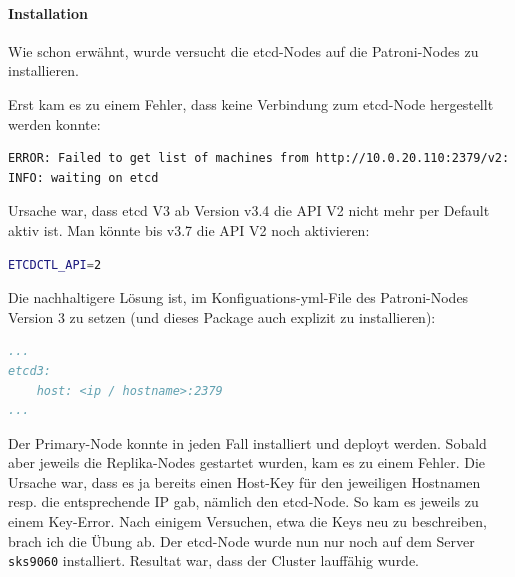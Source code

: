 \clearpage
\begin{flushleft}
    \paragraph{Installation}
    \label{par:patroni_installation}
    Wie schon erwähnt, wurde versucht die \gls{etcd}-Nodes auf die Patroni-Nodes zu installieren.
\end{flushleft}
\begin{flushleft}
    Erst kam es zu einem Fehler, dass keine Verbindung zum \gls{etcd}-Node hergestellt werden konnte:
\lstset{style=gra_codestyle}
\begin{lstlisting}[language=bash, caption=Patroni - etcd API V2 Error,captionpos=b,label={lst:patroni_etcd_api_v2_error},breaklines=true]
ERROR: Failed to get list of machines from http://10.0.20.110:2379/v2: EtcdException('Bad response : 404 page not found\n')
INFO: waiting on etcd
\end{lstlisting}
    Ursache war, dass \gls{etcd} V3 ab Version v3.4 die API V2 nicht mehr per Default aktiv ist.
    Man könnte bis v3.7 die API V2 noch aktivieren:
\lstset{style=gra_codestyle}
\begin{lstlisting}[language=bash, caption=Patroni - etcd API V2 Enable,captionpos=b,label={lst:patroni_etcd_api_v2_enable},breaklines=true]
ETCDCTL_API=2
\end{lstlisting}
    Die nachhaltigere Lösung ist, im Konfiguations-yml-File des Patroni-Nodes Version 3 zu setzen (und dieses Package auch explizit zu installieren):
\lstset{style=gra_codestyle}
\begin{lstlisting}[language=yaml, caption=Patroni - etcd3 Flag,captionpos=b,label={lst:patroni_etcd3_flag},breaklines=true]
...
etcd3:
    host: <ip / hostname>:2379
...
\end{lstlisting}
\end{flushleft}
\begin{flushleft}
    Der Primary-Node konnte in jeden Fall installiert und deployt werden.
    Sobald aber jeweils die Replika-Nodes gestartet wurden, kam es zu einem Fehler.
    Die Ursache war, dass es ja bereits einen Host-Key für den jeweiligen Hostnamen resp.
    die entsprechende IP gab, nämlich den \gls{etcd}-Node.
    So kam es jeweils zu einem Key-Error.
    Nach einigem Versuchen, etwa die Keys neu zu beschreiben, brach ich die Übung ab.
    Der \gls{etcd}-Node wurde nun nur noch auf dem Server \texttt{sks9060} installiert.
    Resultat war, dass der Cluster lauffähig wurde.
\end{flushleft}
